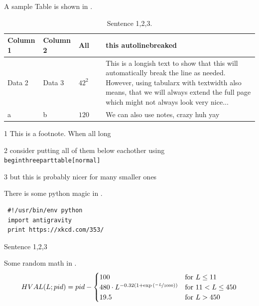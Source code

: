 A sample Table is shown in .
\begin{table}[tb]
 \centering
 \begin{threeparttable}
 \caption[]{ Sentence 1,2,3.}
  \begin{tabularx}{\textwidth}{ll>{$}l<{$}X}
   \toprule
   \textbf{Column 1} & \textbf{Column 2} & \textbf{All math} & \textbf{this autolinebreaked}\\
   \midrule
   Data 2 & Data 3 & 42^{2} & This is a longish text to show that this will automatically break the line as needed. However, using tabularx with textwidth also means, that we will always extend the full page which might
not always look very nice...\\
   a & b & 120 & We can also use notes\tnote{1}, crazy huh\tnote{2} yay\tnote{3}\\
   \bottomrule
  \end{tabularx}
   \begin{tablenotes}
    \item [1] This is a footnote. When all long
    \item [2] consider putting all of them below eachother using \texttt{begin{threeparttable}[normal]}
    \item [3] but this is probably nicer for many smaller ones
   \end{tablenotes}
   \label{tbl:sampletbl}
  \end{threeparttable}
\end{table}

There is some python magic in .

\begin{listing}[!ht]
 \begin{verbatim}
 #!/usr/bin/env python
 import antigravity
 print https://xkcd.com/353/
 \end{verbatim}
\caption[]{ Sentence 1,2,3}
\label{lst:sample}
\end{listing}

Some random math in .
\begin{align}
HVAL(L;pid) = pid -
\begin{cases} 
   100 & \text{for } L \leq 11\\
   480 \cdot L^{-0.32(1+\exp{(\nicefrac{-L}{1000})})} & \text{for } 11 < L \leq 450\\
   19.5 & \text{for } L > 450
  \end{cases}\label{eq:hval}
\end{align}


